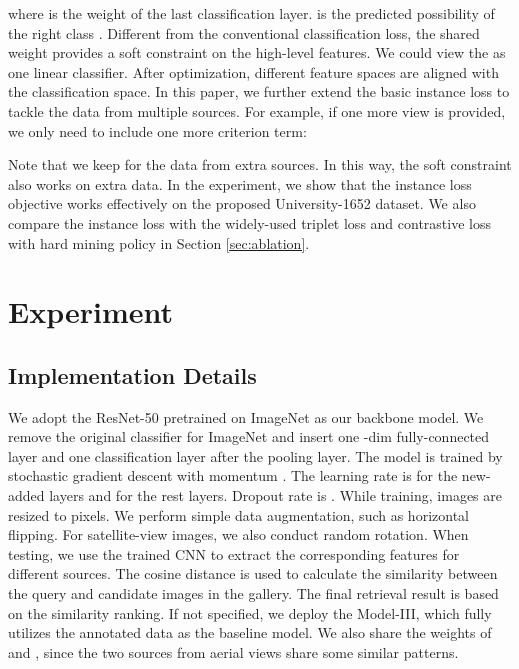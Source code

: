 \documentclass[sigconf]{acmart}
\begin{document}
where  is the weight of the last classification layer.  is the predicted possibility of the right class . Different from the conventional classification loss, the shared weight  provides a soft constraint on the high-level features. We could view the  as one linear classifier. After optimization, different feature spaces are aligned with the classification space.
In this paper, we further extend the basic instance loss to tackle the data from multiple sources. For example, if one more view is provided, we only need to include one more criterion term:

Note that we keep  for the data from extra sources. In this way, the soft constraint also works on extra data. In the experiment, we show that the instance loss objective  works effectively on the proposed University-1652 dataset. We also compare the instance loss with the widely-used triplet loss \cite{chechik2010large,deng2018triplet} and contrastive loss \cite{lin2015learning,workman2015wide,zheng2016discriminatively} with hard mining policy \cite{hermans2017defense,oh2016deep} in Section \ref{sec:ablation}.

\section{Experiment}
\subsection{Implementation Details}
We adopt the ResNet-50 \cite{he2016deep} pretrained on ImageNet \cite{deng2009imagenet} as our backbone model. We remove the original classifier for ImageNet and insert one -dim fully-connected layer and one classification layer after the pooling layer. The model is trained by stochastic gradient descent with momentum . The learning rate is  for the new-added layers and  for the rest layers. Dropout rate is . While training, images are resized to  pixels. We perform simple data augmentation, such as horizontal flipping. For satellite-view images, we also conduct random rotation. When testing, we use the trained CNN to extract the corresponding features for different sources. The cosine distance is used to calculate the similarity between the query and candidate images in the gallery. The final retrieval result is based on the similarity ranking. 
If not specified, we deploy the Model-III, which fully utilizes the annotated data as the baseline model. We also share the weights of  and , since the two sources from aerial views share some similar patterns.
\end{document}
